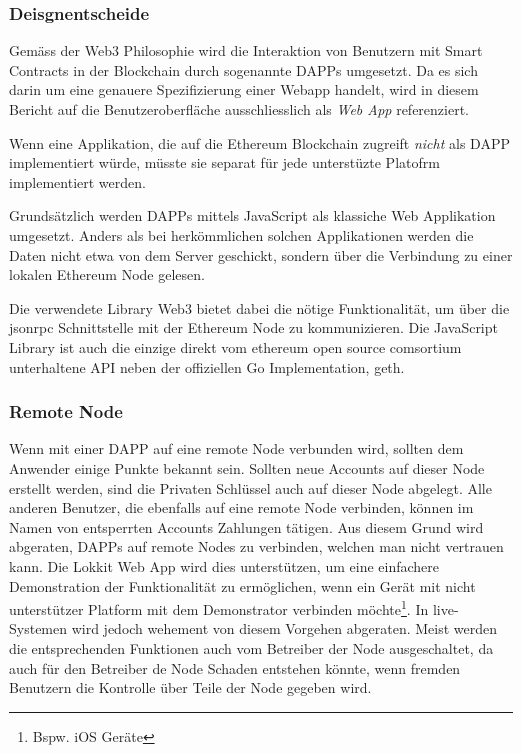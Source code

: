 \subsubsection{Deisgnentscheide}
Gemäss der Web3 Philosophie wird die Interaktion von Benutzern mit Smart Contracts in der Blockchain durch sogenannte \acrshort{DAPPs} umgesetzt. Da es sich darin um eine genauere Spezifizierung einer Webapp handelt, wird in diesem Bericht auf die Benutzeroberfläche ausschliesslich als \emph{Web App} referenziert.\cite[Wiki/DAPP-Developer-Resources, Wiki/Useful-Dapp-Patterns]{github.com/ethereum}\cite{github.com/ethereum/web3js,web3js.readthedocs.io}

Wenn eine Applikation, die auf die Ethereum Blockchain zugreift \emph{nicht} als \acrshort{DAPP} implementiert würde, müsste sie separat für jede unterstüzte Platofrm implementiert werden. 

Grundsätzlich werden \acrshort{DAPPs} mittels JavaScript als klassiche Web Applikation umgesetzt. Anders als bei herkömmlichen solchen Applikationen werden die Daten nicht etwa von dem Server geschickt, sondern über die Verbindung zu einer lokalen Ethereum Node gelesen.\cite[Wiki/DAPP-Developer-Resources, Wiki/Useful-Dapp-Patterns]{github.com/ethereum}

Die verwendete Library Web3 bietet dabei die nötige Funktionalität, um über die jsonrpc Schnittstelle mit der Ethereum Node zu kommunizieren. Die JavaScript Library ist auch die einzige direkt vom ethereum open source comsortium unterhaltene API neben der offiziellen Go Implementation, geth.\cite{github.com/ethereum/web3js}


\subsubsection{Remote Node}
\label{subsubsec:Remote_Node}
Wenn mit einer \acrshort{DAPP} auf eine remote Node verbunden wird, sollten dem Anwender einige Punkte bekannt sein. Sollten neue Accounts auf dieser Node erstellt werden, sind die Privaten Schlüssel auch auf dieser Node abgelegt. Alle anderen Benutzer, die ebenfalls auf eine remote Node verbinden, können im Namen von entsperrten Accounts Zahlungen tätigen. Aus diesem Grund wird abgeraten, \acrshort{DAPPs} auf remote Nodes zu verbinden, welchen man nicht vertrauen kann. Die Lokkit Web App wird dies unterstützen, um eine einfachere Demonstration der Funktionalität zu ermöglichen, wenn ein Gerät mit nicht unterstützer Platform mit dem Demonstrator verbinden möchte\footnote{Bspw. iOS Geräte}. In live-Systemen wird jedoch wehement von diesem Vorgehen abgeraten. Meist werden die entsprechenden Funktionen auch vom Betreiber der Node ausgeschaltet, da auch für den Betreiber de Node Schaden entstehen könnte, wenn fremden Benutzern die Kontrolle über Teile der Node gegeben wird.\cite[Wiki/DAPP-Developer-Resources, Wiki/Useful-Dapp-Patterns]{github.com/ethereum}

